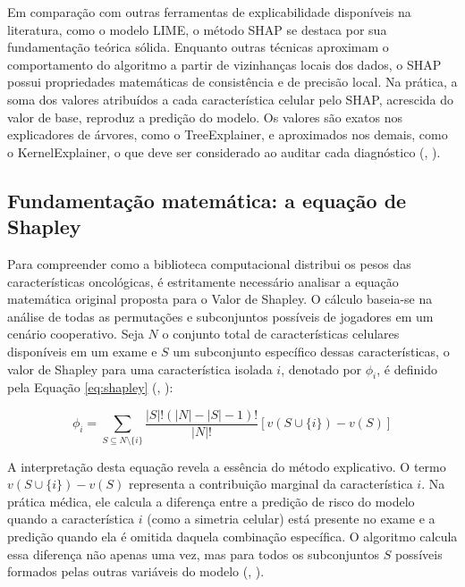\documentclass[
    12pt
    ,oneside
    ,a4paper
    ,chapter=TITLE
    ,section=TITLE
    ,sumario=abnt-6027-2012
    ,english,brazil]{abntex2} %
\begin{document}
Em comparação com outras ferramentas de explicabilidade disponíveis na literatura, como o modelo LIME, o método SHAP se destaca por sua fundamentação teórica sólida. Enquanto outras técnicas aproximam o comportamento do algoritmo a partir de vizinhanças locais dos dados, o SHAP possui propriedades matemáticas de consistência e de precisão local. Na prática, a soma dos valores atribuídos a cada característica celular pelo SHAP, acrescida do valor de base, reproduz a predição do modelo. Os valores são exatos nos explicadores de árvores, como o TreeExplainer, e aproximados nos demais, como o KernelExplainer, o que deve ser considerado ao auditar cada diagnóstico (, \citeyear{Lundberg2017}).

\subsection{Fundamentação matemática: a equação de Shapley}

Para compreender como a biblioteca computacional distribui os pesos das características oncológicas, é estritamente necessário analisar a equação matemática original proposta para o Valor de Shapley. O cálculo baseia-se na análise de todas as permutações e subconjuntos possíveis de jogadores em um cenário cooperativo. Seja $N$ o conjunto total de características celulares disponíveis em um exame e $S$ um subconjunto específico dessas características, o valor de Shapley para uma característica isolada $i$, denotado por $\phi_i$, é definido pela Equação \ref{eq:shapley} (, \citeyear{Lundberg2017}):

\begin{equation}
    \label{eq:shapley}
    \phi_i = \sum_{S \subseteq N \setminus \{i\}} \frac{|S|! (|N| - |S| - 1)!}{|N|!} [v(S \cup \{i\}) - v(S)]
\end{equation}

A interpretação desta equação revela a essência do método explicativo. O termo $v(S \cup \{i\}) - v(S)$ representa a contribuição marginal da característica $i$. Na prática médica, ele calcula a diferença entre a predição de risco do modelo quando a característica $i$ (como a simetria celular) está presente no exame e a predição quando ela é omitida daquela combinação específica. O algoritmo calcula essa diferença não apenas uma vez, mas para todos os subconjuntos $S$ possíveis formados pelas outras variáveis do modelo (, \citeyear{Lundberg2017}).
\end{document}
